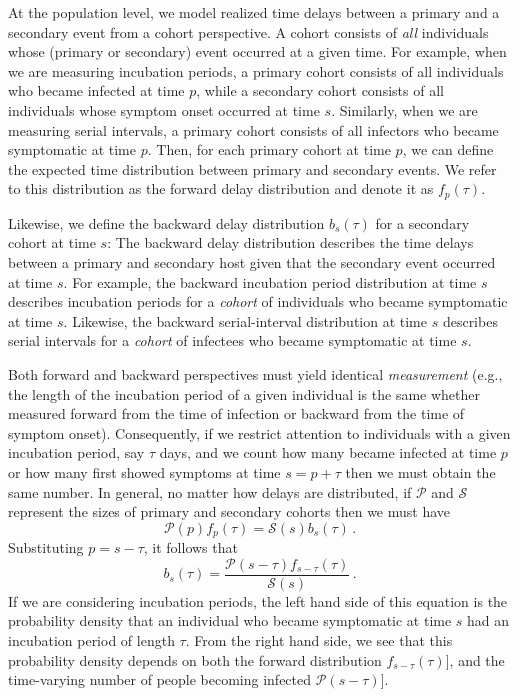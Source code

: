 \documentclass[12pt]{article}
\newcommand{\psymp}{\ensuremath{p}} %
\newcommand{\ssymp}{\ensuremath{s}} %
\newcommand{\psize}{{\mathcal P}} %
\newcommand{\ssize}{{\mathcal S}} %
\begin{document}
At the population level, we model realized time delays between a primary and a secondary event from a cohort perspective.
A cohort consists of \emph{all} individuals whose (primary or secondary) event occurred at a given time. 
For example, when we are measuring incubation periods, a primary cohort consists of all individuals who became infected at time \psymp, while a secondary cohort consists of all individuals whose symptom onset occurred at time $\ssymp$.
Similarly, when we are measuring serial intervals, a primary cohort consists of all infectors who became symptomatic at time $\psymp$.
Then, for each primary cohort at time $\psymp$, we can define the expected time distribution between primary and secondary events.
We refer to this distribution as the forward delay distribution and denote it as $f_\psymp(\tau)$.

Likewise, we define the backward delay distribution $b_\ssymp(\tau)$ for a secondary cohort at time $\ssymp$:
The backward delay distribution describes the time delays between a primary and secondary host given that the secondary event occurred at time $\ssymp$.
For example, the backward incubation period distribution at time $\ssymp$ describes incubation periods for a \emph{cohort} of individuals who became symptomatic at time $\ssymp$.
Likewise, the backward serial-interval distribution at time $\ssymp$ describes serial intervals for a \emph{cohort} of infectees who became symptomatic at time $\ssymp$.

Both forward and backward perspectives
must yield identical \emph{measurement} (e.g., the length of the incubation
period of a given individual is the same whether measured forward from
the time of infection or backward from the time of symptom onset).
Consequently, if we restrict attention to individuals with a given
incubation period, say $\tau$ days, and we count how many became infected at time $\psymp$
or how many first showed symptoms at time $\ssymp=\psymp+\tau$ then we must obtain
the same number. In general, no matter how delays are distributed, if
$\mathcal P$ and $\mathcal S$ represent the sizes of primary and
secondary cohorts then we must have
\begin{equation}
\psize(\psymp) f_\psymp(\tau) = \ssize(\ssymp) b_\ssymp(\tau) \,.
\label{eq:match}
\end{equation}
Substituting $\psymp=\ssymp-\tau$, it follows that
\begin{equation}
b_\ssymp(\tau)= \frac{\psize(\ssymp-\tau) f_{\ssymp-\tau} (\tau)}{\ssize(\ssymp)}\,.
\label{eq:backward}
\end{equation}
If we are considering incubation periods, the left hand side of
this equation is the probability density that an individual
who became symptomatic at time $\ssymp$ had an incubation period of
length $\tau$. From the right hand side, we see that this probability
density depends on both the forward distribution $f_{\ssymp-\tau}(\tau)$], and the time-varying number of people becoming infected $\psize(\ssymp-\tau)$].
\end{document}
